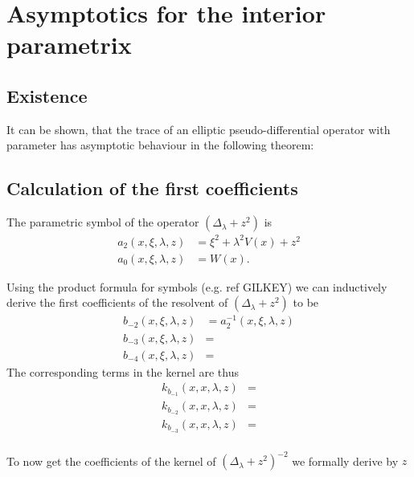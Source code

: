 \section{Asymptotics for the interior parametrix}
\subsection{Existence}
It can be shown, that the trace of an elliptic pseudo-differential operator with
parameter has asymptotic behaviour in the following theorem:


\subsection{Calculation of the first coefficients}
The parametric symbol of the operator $(\Delta_\lambda + z^2)$ is
\begin{align}
    a_2(x,\xi,\lambda,z) &= \xi^2 + \lambda^2 V(x) + z^2 \\
    a_0(x,\xi,\lambda,z) &= W(x).
    \label{eqn:symbol}
\end{align}

Using the product formula for symbols (e.g. ref GILKEY) we can inductively
derive the first coefficients of the resolvent of $(\Delta_\lambda + z^2)$ to be
\begin{align}
    b_{-2}(x,\xi,\lambda,z) &= a_2^{-1}(x,\xi,\lambda,z) \\
    b_{-3}(x,\xi,\lambda,z) &= \\
    b_{-4}(x,\xi,\lambda,z) &=
    \label{eqn:coeff-symbol}
\end{align}
The corresponding terms in the kernel are thus
\begin{align}
    k_{b_{-1}}(x,x,\lambda,z) &= \\
    k_{b_{-2}}(x,x,\lambda,z) &= \\
    k_{b_{-3}}(x,x,\lambda,z) &= \\
    \label{eqn:coeff-kernel}
\end{align}

To now get the coefficients of the kernel of $(\Delta_\lambda + z^2)^{-2}$ we
formally derive by $z$


